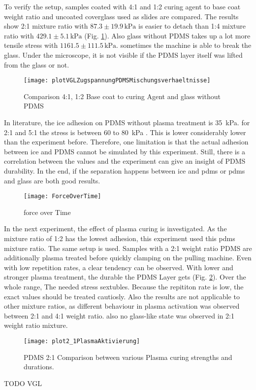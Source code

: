 To verify the setup, samples coated with 4:1 and 1:2 curing agent to base coat weight ratio and uncoated coverglass used as slides are compared. The results show 2:1 mixture ratio with $87.3\pm19.9\,\si{\kilo\pascal}$ is easier to detach than 1:4 mixture ratio with $429.1\pm5.1\,\si{\kilo\pascal}$ (Fig. \ref{fig:vgl4:1zu1:2zuGlas}). Also glass without PDMS takes up a lot more tensile stress with $1161.5\pm111.5\,\si{\kilo\pascal}$. sometimes the machine is able to break the glass. Under the microscope, it is not visible if the PDMS layer itself was lifted from the glass or not.

\begin{figure}[hbt!]
	\centering
	\texttt{[image: plotVGLZugspannungPDMSMischungsverhaeltnisse]}
	\caption{Comparison 4:1, 1:2 Base coat to curing Agent and glass without PDMS}
	\label{fig:vgl4:1zu1:2zuGlas}
\end{figure}

In literature, the ice adhesion on PDMS without plasma treatment is \SI{35}{\kilo\pascal}. for 2:1 and 5:1 the stress is between $60$ to \SI{80}{\kilo\pascal} \cite{IbanezIbanez.2022}. This is lower considerably lower than the experiment before. Therefore, one limitation is that the actual adhesion between ice and PDMS cannot be simulated by this experiment. Still, there is a correlation between the values and the experiment can give an insight of PDMS durability. In the end, if the separation happens between ice and pdms or pdms and glass are both good results. 

\begin{figure}[hbt!]
	\centering
	\texttt{[image: ForceOverTime]}
	\caption{force over Time}
\end{figure}

In the next experiment, the effect of plasma curing is investigated. As the mixture ratio of 1:2 has the lowest adhesion, this experiment used this pdms mixture ratio. The same setup is used. Samples with a 2:1 weight ratio PDMS are additionally plasma treated before quickly clamping on the pulling machine. Even with low repetition rates, a clear tendency can be observed. With lower and stronger plasma treatment, the durable the PDMS Layer gets (Fig. \ref{fig:PlotPlasmaAktivierung}). Over the whole range, The needed stress sextubles. Because the repititon rate is low, the exact values should be treated cautiosly. Also the results are not applicable to other mixture ratios, as different behaviour in plasma activation was observed between 2:1 and 4:1 weight ratio. also no glass-like state was observed in 2:1 weight ratio mixture.


\begin{figure}[hbt!]
	\centering
	\texttt{[image: plot2\_1PlasmaAktivierung]}
	\caption{PDMS 2:1 Comparison between various Plasma curing strengths and durations.}
	\label{fig:PlotPlasmaAktivierung}
\end{figure}


TODO VGL
